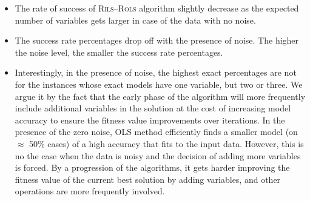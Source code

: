 \documentclass[a4paper,12pt]{elsarticle}
\begin{document}
\begin{itemize}
    \item The rate of success of \textsc{Rils}--\textsc{Rols} algorithm  slightly decrease as the expected number of variables gets larger in case of the data with no noise.
    \item The success rate percentages drop off with the presence of noise. The higher the noise level, the smaller the success rate percentages. 
    \item Interestingly, in the presence of noise, the highest exact percentages are not for the instances whose exact models have one variable, but two or three. We argue it by the fact that the early phase of the algorithm will more frequently include additional variables in the solution at the cost of increasing model accuracy to ensure the fitness value improvements over iterations. In the presence of the zero noise, OLS method efficiently finds a smaller model (on $\approx$ 50\% cases) of a high  accuracy that fits to the input data. However, this is no the case when the data is noisy and the decision of adding more variables is forced. By a progression of the algorithms, it gets harder improving the fitness value of the current best solution by adding variables, and other operations are more frequently involved. %
\end{itemize}
\end{document}
